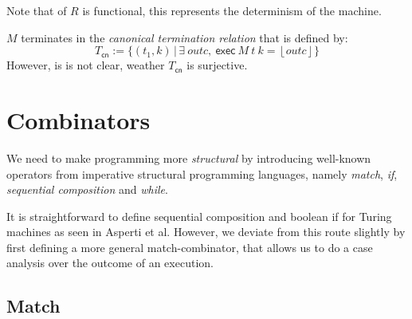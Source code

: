 \documentclass{psartcl}
\newcommand{\MS}[1]{\textsf{#1}}
\newcommand{\setOf}[1]{\bigl \{ #1 \bigr \}}
\newcommand{\setMap}[2]{\setOf{#1 \,\big|\, #2}}
\newcommand{\Some}[1]{\left\lfloor #1\right\rfloor}
\begin{document}
Note that of $R$ is functional, this represents the determinism of the machine.

\begin{lemma}
  \label{lem:canonical-term-relation}
  $M$ terminates in the \emph{canonical termination relation} that is defined by:
  $$T_{\MS{cn}} := \setMap{(t_1, k)}{ \exists~outc,~ \MS{exec}~M~t~k = \Some{outc} }$$
  However, is is not clear, weather $T_{\MS{cn}}$ is surjective.
\end{lemma}

\section{Combinators}

We need to make programming more \textit{structural} by introducing well-known operators from imperative structural programming languages, namely
\emph{match}, \emph{if}, \emph{sequential composition} and \emph{while}.

It is straightforward to define sequential composition and boolean if for Turing machines as seen in Asperti et al.
However, we deviate from this route slightly by first defining a more general match-combinator, that allows us to do a case analysis over the outcome
of an execution.

\subsection{Match}
\end{document}

